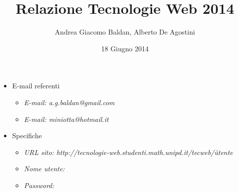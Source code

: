 \documentclass[a4paper, 12pt]{article}
\title{Relazione Tecnologie Web 2014}
\author{Andrea Giacomo Baldan, Alberto De Agostini}
\date{18 Giugno 2014}
\begin{document}
\maketitle

\begin{itemize}
\item E-mail referenti
  \begin{itemize}
  \item \emph{E-mail: a.g.baldan@gmail.com}
  \item \emph{E-mail: miniotta@hotmail.it}
  \end{itemize}
\item Specifiche
  \begin{itemize}
  \item \emph{URL sito: http://tecnologie-web.studenti.math.unipd.it/tecweb/\~utente}
  \item \emph{Nome utente: }
  \item \emph{Password: }
  \end{itemize}
\end{itemize}

%
%
%

\end{document}
